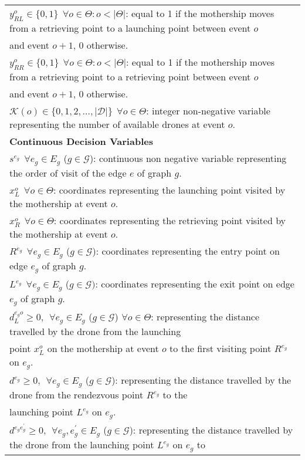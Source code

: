 \begin{table}[h]
\begin{tabular}{|l|}
$y_{RL}^o \in \{0,1\}  \:\: \forall o \in \Theta:o<|\Theta|$: equal to 1 if the mothership moves from a retrieving point to a launching point between event $o$\\ \hspace*{1cm} and event $o+1$, 0 otherwise.\\
$y_{RR}^o \in \{0,1\}  \:\: \forall o \in \Theta:o<|\Theta|$: equal to 1 if the mothership moves from a retrieving point to a retrieving point between event $o$\\ \hspace*{1cm} and event $o+1$, 0 otherwise.\\
$\mathcal{K}(o) \in \{0, 1, 2, \ldots, |\mathcal D|\}  \:\: \forall o \in \Theta$: integer non-negative variable representing the number of available drones at event $o$.\\
\hline
\textbf{Continuous Decision Variables}\\
\hline
$s^{e_g} \:\: \forall e_g \in E_g$ ($g \in \mathcal{G}$): continuous non negative variable representing the order of visit of the edge $e$ of graph $g$.\\
$x_L^o \:\: \forall o \in \Theta$: coordinates representing the launching point visited by the mothership at event $o$.\\
$x_R^o \:\: \forall o \in \Theta$: coordinates representing the retrieving point visited by the mothership at event $o$.\\
$R^{e_g} \:\: \forall e_g \in E_g$ ($g \in \mathcal{G}$): coordinates representing the entry point on edge $e_g$ of graph $g$.\\
$L^{e_g} \:\: \forall e_g \in E_g$ ($g \in \mathcal{G})$: coordinates representing the exit point on edge $e_g$ of graph $g$.\\
$d_L^{e_g o} \geq 0, \:\: \forall e_g \in E_g$ ($g \in \mathcal{G}$) $\forall o \in \Theta$: representing the distance travelled by the drone from the launching\\
\hspace*{1cm} point $x_L^o$ on the mothership at event $o$ to the first visiting point $R^{e_g}$ on $e_g$.\\
$d^{e_g} \geq 0, \:\: \forall e_g \in E_g$ ($g \in \mathcal{G}$): representing the distance travelled by the drone from the rendezvous point $R^{e_g}$ to the \\
\hspace*{1cm} launching point $L^{e_g}$ on $e_g$. \\
$d^{e_ge^\prime_g} \geq 0, \:\: \forall e_g, e^\prime_g \in E_g $ ($g \in \mathcal{G}$): representing the distance travelled by the drone from the launching point $L^{e_g}$ on $e_g$ to\\

\end{tabular}
\end{table}
